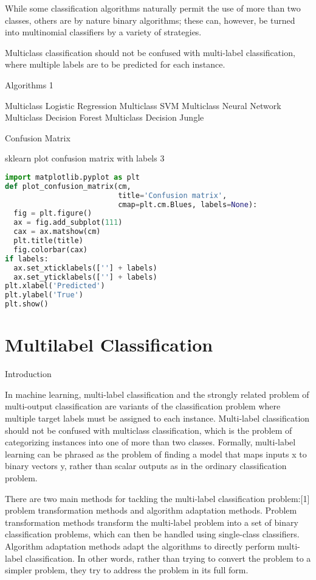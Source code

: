 While some classification algorithms naturally permit the use of more than two classes, others are by nature binary algorithms; these can, however, be turned into multinomial classifiers by a variety of strategies.

Multiclass classification should not be confused with multi-label classification, where multiple labels are to be predicted for each instance.

Algorithms 1


Multiclass Logistic Regression
Multiclass SVM
Multiclass Neural Network
Multiclass Decision Forest
Multiclass Decision Jungle

Confusion Matrix

sklearn plot confusion matrix with labels 3


\begin{lstlisting}[language=Python]
import matplotlib.pyplot as plt
def plot_confusion_matrix(cm,
                          title='Confusion matrix',
                          cmap=plt.cm.Blues, labels=None):
  fig = plt.figure()
  ax = fig.add_subplot(111)
  cax = ax.matshow(cm)
  plt.title(title)
  fig.colorbar(cax)
if labels:
  ax.set_xticklabels([''] + labels)
  ax.set_yticklabels([''] + labels)
plt.xlabel('Predicted')
plt.ylabel('True')
plt.show()
\end{lstlisting}


\section{Multilabel Classification}

Introduction

In machine learning, multi-label classification and the strongly related problem of multi-output classification are variants of the classification problem where multiple target labels must be assigned to each instance. Multi-label classification should not be confused with multiclass classification, which is the problem of categorizing instances into one of more than two classes. Formally, multi-label learning can be phrased as the problem of finding a model that maps inputs x to binary vectors y, rather than scalar outputs as in the ordinary classification problem.

There are two main methods for tackling the multi-label classification problem:[1] problem transformation methods and algorithm adaptation methods. Problem transformation methods transform the multi-label problem into a set of binary classification problems, which can then be handled using single-class classifiers. Algorithm adaptation methods adapt the algorithms to directly perform multi-label classification. In other words, rather than trying to convert the problem to a simpler problem, they try to address the problem in its full form.

